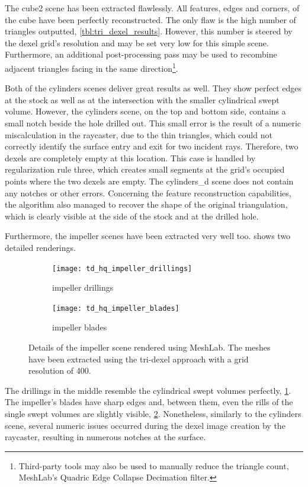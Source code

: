 %
The cube2 scene has been extracted flawlessly.
All features, \ie edges and corners, of the cube have been perfectly reconstructed.
The only flaw is the high number of triangles outputted, \cf \cref{tbl:tri_dexel_results}.
However, this number is steered by the dexel grid's resolution and may be set very low for this simple scene.
Furthermore, an additional post-processing pass may be used to recombine adjacent triangles facing in the same direction\footnote{Third-party tools may also be used to manually reduce the triangle count, \eg MeshLab's Quadric Edge Collapse Decimation filter.}.

Both of the cylinders scenes deliver great results as well.
They show perfect edges at the stock as well as at the intersection with the smaller cylindrical swept volume.
However, the cylinders scene, on the top and bottom side, contains a small notch beside the hole drilled out.
This small error is the result of a numeric miscalculation in the raycaster, due to the thin triangles, which could not correctly identify the surface entry and exit for two incident rays.
Therefore, two dexels are completely empty at this location.
This case is handled by regularization rule three, which creates small segments at the grid's occupied points where the two dexels are empty.
The cylinders\_d scene does not contain any notches or other errors.
Concerning the feature reconstruction capabilities, the algorithm also managed to recover the shape of the original triangulation, which is clearly visible at the side of the stock and at the drilled hole.

Furthermore, the impeller scenes have been extracted very well too.
 shows two detailed renderings.
%
\begin{figure}
	\centering
	\begin{subfigure}[b]{0.49\textwidth}
		\centering
		\texttt{[image: td\_hq\_impeller\_drillings]}
		\caption{impeller drillings}
		\label{fig:td_hq_impeller_drillings}
	\end{subfigure}
	\begin{subfigure}[b]{0.49\textwidth}
		\centering
		\texttt{[image: td\_hq\_impeller\_blades]}
		\caption{impeller blades}
		\label{fig:td_hq_impeller_blades}
	\end{subfigure}
	\caption{
		Details of the impeller scene rendered using MeshLab.
		The meshes have been extracted using the tri-dexel approach with a grid resolution of 400.
	}
	\label{fig:td_hq_impeller_details}
\end{figure}
%
The drillings in the middle resemble the cylindrical swept volumes perfectly, \cf \cref{fig:td_hq_impeller_drillings}.
The impeller's blades have sharp edges and, between them, even the rills of the single swept volumes are slightly visible, \cf \cref{fig:td_hq_impeller_blades}.
Nonetheless, similarly to the cylinders scene, several numeric issues occurred during the dexel image creation by the raycaster, resulting in numerous notches at the surface.

